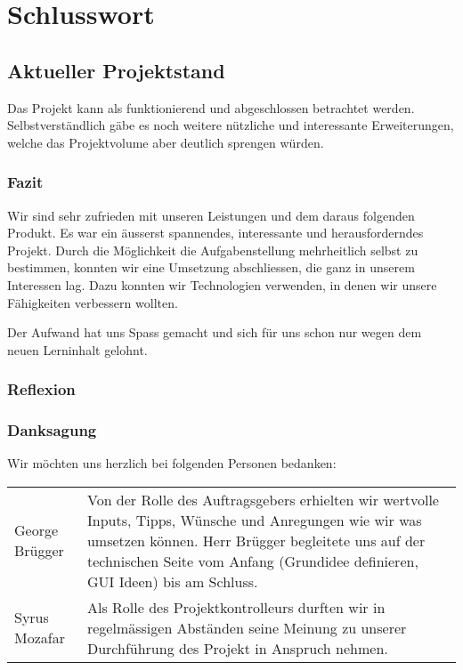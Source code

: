
\chapter{Schlusswort}
\label{chap:Schlusswort}
\section{Aktueller Projektstand}
Das Projekt kann als funktionierend und abgeschlossen betrachtet werden. Selbstverständlich gäbe es noch weitere nützliche und interessante Erweiterungen, welche das Projektvolume aber deutlich sprengen würden.

\subsection{Fazit}
Wir sind sehr zufrieden mit unseren Leistungen und dem daraus folgenden Produkt. Es war ein äusserst spannendes, interessante und herausforderndes Projekt. Durch die Möglichkeit die Aufgabenstellung mehrheitlich selbst zu bestimmen, konnten wir eine Umsetzung abschliessen, die ganz in unserem Interessen lag. Dazu konnten wir Technologien verwenden, in denen wir unsere Fähigkeiten verbessern wollten.

Der Aufwand hat uns Spass gemacht und sich für uns schon nur wegen dem neuen Lerninhalt gelohnt.





\subsection{Reflexion}



\subsection{Danksagung}
Wir möchten uns herzlich bei folgenden Personen bedanken:
\begin{tabular}{l l}
George Brügger & Von der Rolle des Auftragsgebers erhielten wir wertvolle Inputs, Tipps, Wünsche und Anregungen wie wir was umsetzen können. Herr Brügger begleitete uns auf der technischen Seite vom Anfang (Grundidee definieren, GUI Ideen) bis am Schluss.\\
Syrus Mozafar & Als Rolle des Projektkontrolleurs durften wir in regelmässigen Abständen seine Meinung zu unserer Durchführung des Projekt in Anspruch nehmen.\\
\end{tabular}
